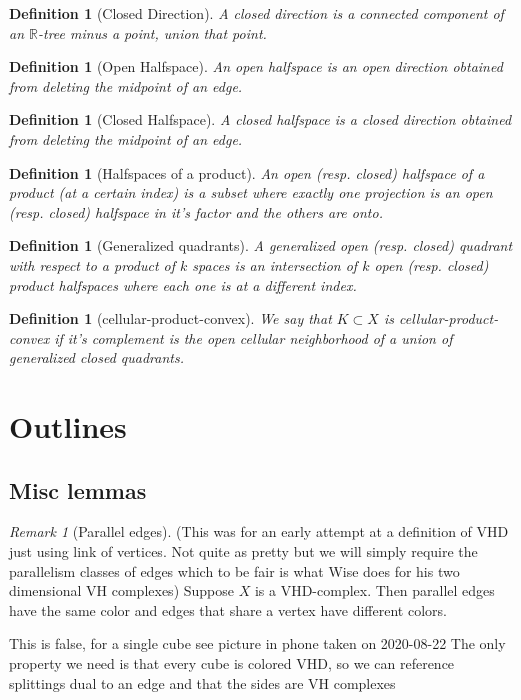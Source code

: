 \documentclass{article}
\theoremstyle{mystyle}
\newtheorem{defn}[thm]{Definition}
\theoremstyle{remark}
\newtheorem{rmk}{Remark}[section]
\begin{document}
\begin{defn}[Closed Direction] A closed direction is a connected component of an \(\mathbb{R}\)-tree minus a point, union that point.
\end{defn}
\begin{defn}[Open Halfspace] An open halfspace is an open direction obtained from deleting the midpoint of an edge.
\end{defn}
\begin{defn}[Closed Halfspace] A closed halfspace is a closed direction obtained from deleting the midpoint of an edge.
\end{defn}
\begin{defn}[Halfspaces of a product] An open (resp. closed) halfspace of a product (at a certain index) is a subset where exactly one projection is an open (resp. closed)  halfspace in it's factor and the others are onto.
\end{defn}
\begin{defn}[Generalized quadrants] A generalized open (resp. closed) quadrant with respect to a product of \(k\) spaces is an intersection of \(k\) open (resp. closed) product halfspaces where each one is at a different index.
\end{defn}
\begin{defn}[cellular-product-convex] We say that \(K \subset X\) is cellular-product-convex if it's complement is the open cellular neighborhood of a union of generalized closed quadrants.
\end{defn}



\section{Outlines}

\subsection{Misc lemmas}

\begin{rmk}
    [Parallel edges]
    (This was for an early attempt at a definition of VHD just using link of vertices. Not quite as pretty but we will simply require the parallelism classes of edges which to be fair is what Wise does for his two dimensional VH complexes)
    Suppose \(X\) is a VHD-complex. Then parallel edges have the same color and edges that share a vertex have different colors.

    This is false, for a single cube see picture in phone taken on 2020-08-22
    The only property we need is that every cube is colored VHD, so we can reference splittings dual to an edge and that the sides are VH complexes
\end{rmk}
\end{document}
